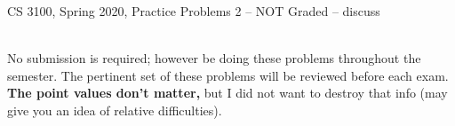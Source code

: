 \documentclass[12pt]{article}
\begin{document}



\begin{center}
\begin{large}
  CS 3100, Spring 2020, Practice Problems 2 -- NOT Graded -- discuss
  \ \\
  \ \\      
\end{large}


\end{center}
\date{}


\noindent No submission is required; however be doing these problems
throughout the semester. The pertinent set of these problems will be reviewed
before each exam. {\bf The point values don't matter,} but I did not want to
destroy that info (may give you an idea of relative difficulties).
\end{document}
